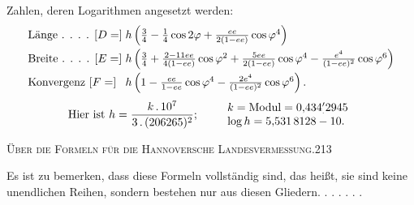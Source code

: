 Zahlen, deren Logarithmen angesetzt werden:
\[
\begin{array}{@{}l@{\;}l@{}}
\text{Länge . . . . }[D=]&h\left(\frac34-\frac14\cos2\varphi+\frac{ee}{2(1-ee)}\cos\varphi^4\right)\\[6pt]
\text{Breite . . . . }[E=]&h\left(\frac34+\frac{2-11ee}{4(1-ee)}\cos\varphi^2+\frac{5ee}{2(1-ee)}\cos\varphi^4-\frac{e^4}{(1-ee)^2}\cos\varphi^6\right)\\[6pt]
\text{Konvergenz }[F=]&h\left(1-\frac{ee}{1-ee}\cos\varphi^4-\frac{2e^4}{(1-ee)^2}\cos\varphi^6\right).
\end{array}
\]
\[
\text{Hier ist }h=\frac{k\,.\,10^7}{3\,.\,(206265)^2};\qquad
\begin{array}{l}
k=\text{Modul}=0{,}434\rlap{\raisebox{-.5ex}{\tiny.}}^{\prime}2945\\
\log h=5{,}531\,8128-10.
\end{array}
\]

\par\clearpage
\noindent\mbox{}\hfill{\small\textsc{Über die Formeln für die Hannoversche Landesvermessung.}}\hfill213\par\medskip
Es ist zu bemerken, dass diese Formeln vollständig sind, das heißt, sie sind keine unendlichen Reihen, sondern bestehen nur aus diesen Gliedern. . . . . . .

